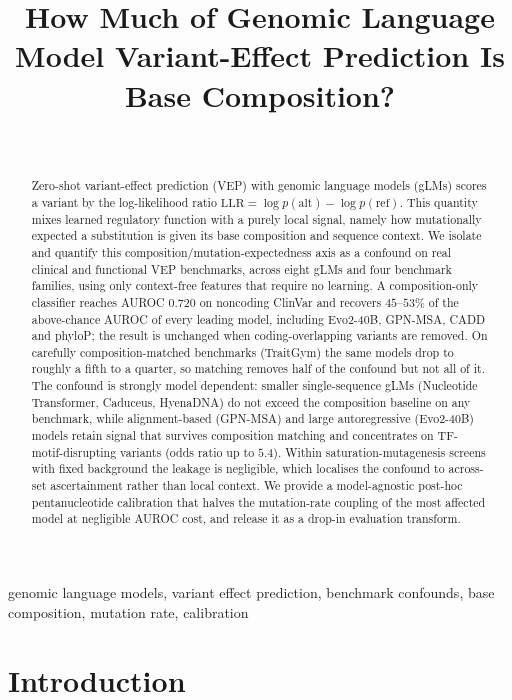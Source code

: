 \documentclass[pmlr]{jmlr}
\title[How Much of gLM Variant-Effect Prediction Is Base Composition?]{How Much of Genomic Language Model Variant-Effect Prediction Is Base Composition?}
\author{\centering \Name{Rikhin Kavuru}\\[2pt]
 \makebox[\linewidth][c]{\normalfont\itshape Independent Researcher}}
\begin{document}
\maketitle

\begin{abstract}
Zero-shot variant-effect prediction (VEP) with genomic language models (gLMs) scores a
variant by the log-likelihood ratio $\mathrm{LLR}=\log p(\text{alt})-\log p(\text{ref})$.
This quantity mixes learned regulatory function with a purely local signal, namely how
mutationally expected a substitution is given its base composition and sequence context.
We isolate and quantify this composition/mutation-expectedness axis as a confound on real
clinical and functional VEP benchmarks, across eight gLMs and four benchmark families, using
only context-free features that require no learning. A composition-only classifier reaches
AUROC $0.720$ on noncoding ClinVar and recovers $45$--$53\%$ of the above-chance AUROC of
every leading model, including Evo2-40B, GPN-MSA, CADD and phyloP; the result is unchanged
when coding-overlapping variants are removed. On carefully composition-matched benchmarks
(TraitGym) the same models drop to roughly a fifth to a quarter, so matching removes half of
the confound but not all of it. The confound is strongly
model dependent: smaller single-sequence gLMs (Nucleotide Transformer, Caduceus, HyenaDNA)
do not exceed the composition baseline on any benchmark, while alignment-based
(GPN-MSA) and large autoregressive (Evo2-40B) models retain signal that survives
composition matching and concentrates on TF-motif-disrupting variants (odds ratio up to
$5.4$). Within saturation-mutagenesis screens with fixed background the leakage is
negligible, which localises the confound to across-set ascertainment rather than local
context. We provide a model-agnostic post-hoc pentanucleotide calibration that halves the
mutation-rate coupling of the most affected model at negligible AUROC cost, and release it
as a drop-in evaluation transform.
\end{abstract}

\begin{keywords}
genomic language models, variant effect prediction, benchmark confounds, base composition,
mutation rate, calibration
\end{keywords}

\section{Introduction}
\label{sec:intro}
\end{document}
